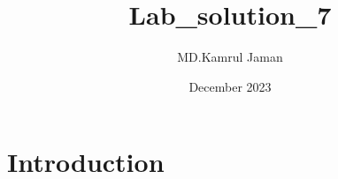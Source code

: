 \documentclass{article}
\title{Lab_solution_7}
\author{MD.Kamrul Jaman}
\date{December 2023}
\begin{document}
\maketitle

\section{Introduction}
\end{document}
